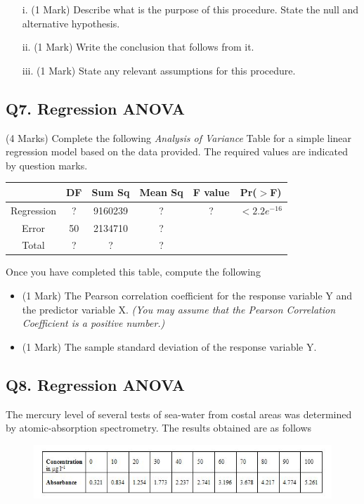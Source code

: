 \documentclass[a4paper,12pt]{article}
\begin{document}
\begin{itemize}
	\item[i.] (1 Mark) Describe what is the purpose of this procedure. State the null and alternative hypothesis.
	\item[ii.] (1 Mark) Write the conclusion that follows from it.
	\item[iii.] (1 Mark) State any relevant assumptions for this procedure.
\end{itemize}

\subsection*{Q7. Regression ANOVA}
(4 Marks) Complete the following \textit{Analysis of Variance} Table for a simple linear regression model based on the data provided. The required values are indicated by question marks.
\begin{center}
	\begin{tabular}{|c|c|c|c|c|c|} \hline
		& DF & 	Sum Sq &	Mean Sq &	F value &   	Pr($>$F)    \\ \hline
		Regression &  ? &	9160239 &	? &	 ? &	$< 2.2e^{-16}$ \\ \hline
		Error  & 50 &	2134710 &  	?   &            &       \\ \hline
		Total  & ?  &	? &  	?  &            &       \\ \hline
	\end{tabular} 
\end{center}

Once you have completed this table, compute the following
\begin{itemize}
	\item (1 Mark) The Pearson correlation coefficient for the response variable Y and the predictor variable X.\textit{ (You may assume that the Pearson Correlation Coefficient is a positive number.)}
	\item (1 Mark) The sample standard deviation of the response variable Y.
\end{itemize}
\newpage
\subsection*{Q8. Regression ANOVA}
The mercury level of several tests of sea-water from costal areas was determined by atomic-absorption spectrometry. The results obtained are as follows

\begin{figure}[h!]
\centering
\includegraphics[width=1.1\linewidth]{image/regressionData}
\end{figure}
\end{document}
